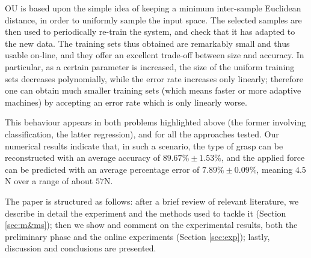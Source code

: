 OU is based upon the simple idea of keeping a minimum inter-sample
Euclidean distance, in order to uniformly sample the input space. The
selected samples are then used to periodically re-train the system,
and check that it has adapted to the new data. The training sets thus
obtained are remarkably small and thus usable on-line, and they offer
an excellent trade-off between size and accuracy. In particular, as a
certain parameter is increased, the size of the uniform training sets
decreases polynomially, while the error rate increases only
linearly; therefore one can obtain much smaller training sets (which
means faster or more adaptive machines) by accepting an error rate
which is only linearly worse.

This behaviour appears in both problems highlighted above (the former
involving classification, the latter regression), and for all the
approaches tested. Our numerical results indicate that, in such a
scenario, the type of grasp can be reconstructed with an average
accuracy of $89.67\% \pm 1.53\%$, and the applied force can be
predicted with an average percentage error of $7.89\% \pm 0.09\%$,
meaning $4.5$N over a range of about $57$N.

The paper is structured as follows: after a brief review of relevant
literature, we describe in detail the experiment and the methods used
to tackle it (Section \ref{sec:m&ms}); then we show and comment on the
experimental results, both the preliminary phase and the online
experiments (Section \ref{sec:exp}); lastly, discussion and
conclusions are presented.

